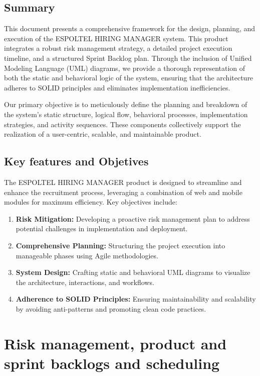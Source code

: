 \documentclass{scrreprt}
\begin{document}
\section{Summary}
This document presents a comprehensive framework for the design, planning, and execution of the ESPOLTEL HIRING MANAGER system. This product integrates a robust risk management strategy, a detailed project execution timeline, and a structured Sprint Backlog plan. Through the inclusion of Unified Modeling Language (UML) diagrams, we provide a thorough representation of both the static and behavioral logic of the system, ensuring that the architecture adheres to SOLID principles and eliminates implementation inefficiencies.

Our primary objective is to meticulously define the planning and breakdown of the system’s static structure, logical flow, behavioral processes, implementation strategies, and activity sequences. These components collectively support the realization of a user-centric, scalable, and maintainable product.

\section{Key features and Objetives}
The ESPOLTEL HIRING MANAGER product is designed to streamline and enhance the recruitment process, leveraging a combination of web and mobile modules for maximum efficiency. Key objectives include:

\begin{enumerate}
	\item \textbf{Risk Mitigation:} Developing a proactive risk management plan to address potential challenges in implementation and deployment.
	\item \textbf{Comprehensive Planning:} Structuring the project execution into manageable phases using Agile methodologies.
	\item \textbf{System Design:} Crafting static and behavioral UML diagrams to visualize the architecture, interactions, and workflows.
	\item \textbf{Adherence to SOLID Principles:} Ensuring maintainability and scalability by avoiding anti-patterns and promoting clean code practices.
\end{enumerate}

\chapter{Risk management, product and sprint backlogs and scheduling}
\end{document}
